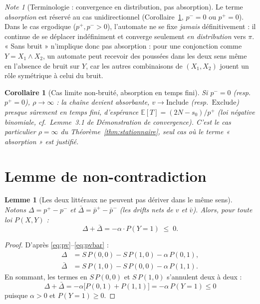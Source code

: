 \documentclass[12pt,a4paper]{article}
\newtheorem{lemma}[theorem]{Lemme}
\newtheorem{corollary}[theorem]{Corollaire}
\theoremstyle{remark}
\newtheorem{note}{Note}[section]
\newcommand{\Inc}{\ensuremath{\mathrm{Include}}}
\newcommand{\Exc}{\ensuremath{\mathrm{Exclude}}}
\newcommand{\vbar}{\bar{v}}
\begin{document}
\begin{note}[Terminologie : convergence en distribution, pas absorption]
Le terme \emph{absorption} est réservé au cas unidirectionnel
(Corollaire~\ref{cor:unidirectionnel}, $p^-=0$ ou $p^+=0$). Dans le cas
ergodique ($p^+,p^->0$), l'automate ne se fixe \emph{jamais} définitivement :
il continue de se déplacer indéfiniment et converge seulement \emph{en
distribution} vers $\pi$. « Sans bruit » n'implique donc pas absorption : pour
une conjonction comme $Y=X_1\wedge X_2$, un automate peut recevoir des
poussées dans les deux sens même en l'absence de bruit sur $Y$, car les autres
combinaisons de $(X_1,X_2)$ jouent un rôle symétrique à celui du bruit.
\end{note}

\begin{corollary}[Cas limite non-bruité, absorption en temps fini]\label{cor:unidirectionnel}
Si $p^-=0$ (resp. $p^+=0$), $\rho\to\infty$ : la chaîne devient absorbante,
$v\to\Inc$ (resp.\ $\Exc$) presque sûrement en temps fini, d'espérance
$\mathbb E[T]=(2N-s_0)/p^+$ (loi négative binomiale, cf.\
Lemme~3.1 de \textit{Démonstration de convergence}). C'est le cas
particulier $\rho=\infty$ du Théorème~\ref{thm:stationnaire}, seul cas où le
terme « absorption » est justifié.
\end{corollary}

\section{Lemme de non-contradiction}

\begin{lemma}[Les deux littéraux ne peuvent pas dériver dans le même sens]\label{lem:noncontradiction}
Notons $\Delta = p^+-p^-$ et $\bar\Delta=\bar p^+-\bar p^-$ (les drifts nets de
$v$ et $\vbar$). Alors, pour toute loi $P(X,Y)$ :
\[
  \boxed{\Delta+\bar\Delta = -\alpha\cdot P(Y{=}1) \;\le\; 0.}
\]
\end{lemma}

\begin{proof}
D'après \eqref{eq:pv}--\eqref{eq:pvbar} :
\begin{align*}
  \Delta &= S\,P(0,0) - S\,P(1,0) - \alpha\,P(0,1), \\
  \bar\Delta &= S\,P(1,0) - S\,P(0,0) - \alpha\,P(1,1).
\end{align*}
En sommant, les termes en $S\,P(0,0)$ et $S\,P(1,0)$ s'annulent deux à deux :
\[
  \Delta+\bar\Delta = -\alpha\bigl[P(0,1)+P(1,1)\bigr] = -\alpha\,P(Y{=}1) \le 0
\]
puisque $\alpha>0$ et $P(Y{=}1)\ge0$.
\end{proof}
\end{document}
